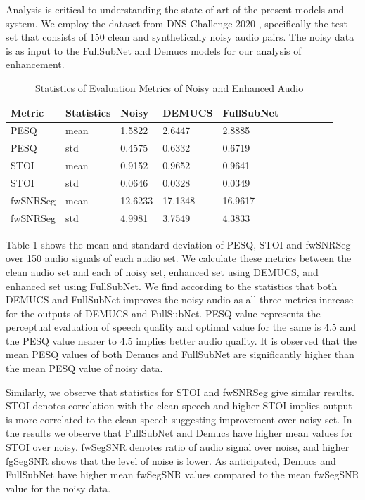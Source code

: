 \documentclass{article}
\begin{document}
Analysis is critical to understanding the state-of-art of the present models and system. We employ the dataset from DNS Challenge 2020 \cite{DNSchallenge2020}, specifically the test set that consists of 150 clean and synthetically noisy audio pairs. The noisy data is as input to the FullSubNet and Demucs models for our analysis of enhancement. 

\begin{table}[!ht]
    \centering
    \caption{Statistics of Evaluation Metrics of Noisy and Enhanced Audio}
    \begin{tabular}{|l|l|l|l|l|l|l|l|l|l|}
    \hline
        Metric & Statistics & Noisy & DEMUCS & FullSubNet   \\ \hline
        PESQ & mean & 1.5822 & 2.6447 & 2.8885   \\ \hline
        PESQ & std & 0.4575 & 0.6332 & 0.6719  \\ \hline
        STOI & mean & 0.9152 & 0.9652 & 0.9641 \\ \hline
        STOI & std & 0.0646 & 0.0328 & 0.0349   \\ \hline
        fwSNRSeg & mean & 12.6233 & 17.1348 & 16.9617   \\ \hline
        fwSNRSeg & std & 4.9981 & 3.7549 & 4.3833  \\ \hline
    \end{tabular}
\end{table}

Table 1 shows the mean and standard deviation of PESQ, STOI and fwSNRSeg over 150 audio signals of each audio set. We calculate these metrics between the clean audio set and each of noisy set, enhanced set using DEMUCS, and enhanced set using FullSubNet. We find according to the statistics that both DEMUCS and FullSubNet improves the noisy audio as all three metrics increase for the outputs of DEMUCS and FullSubNet. PESQ value represents the perceptual evaluation of speech quality and optimal value for the same is 4.5 and the PESQ value nearer to 4.5 implies better audio quality. It is observed that the mean PESQ values of both Demucs and FullSubNet are significantly higher than the mean PESQ value of noisy data. 

Similarly, we observe that statistics for STOI and fwSNRSeg give similar results. STOI denotes correlation with the clean speech and higher STOI implies output is more correlated to the clean speech suggesting improvement over noisy set. In the results we observe that FullSubNet and Demucs have higher mean values for STOI over noisy. fwSegSNR denotes ratio of audio signal over noise, and higher fgSegSNR shows that the level of noise is lower. As anticipated, Demucs and FullSubNet have higher mean fwSegSNR values compared to the mean fwSegSNR value for the noisy data. 
\end{document}
